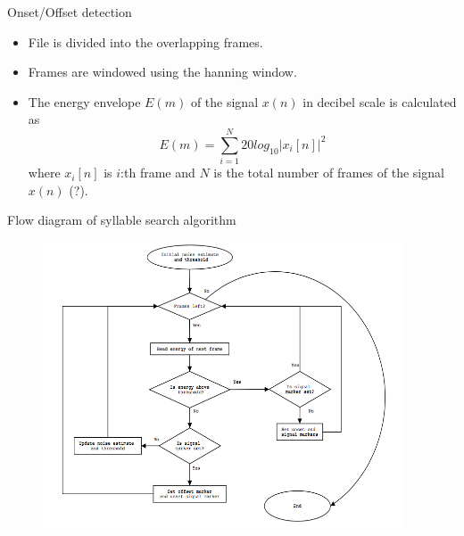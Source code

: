\documentclass[10pt]{beamer}
\begin{document}
\begin{frame}[fragile]{Onset/Offset detection}
\begin{itemize}
\item File is divided into the overlapping frames.
\item Frames are windowed using the hanning window.
\item The energy envelope $E(m)$ of the signal $x(n)$ in decibel scale is calculated as
\begin{equation}
E(m) = \sum\limits_{i=1}^{N} 20log_{10}|x_i[n]|^2
\end{equation}
where $x_i[n]$ is $i$:th frame and $N$ is the total number of frames of the signal $x(n)$ (?).
\end{itemize}
\end{frame}

\begin{frame}[fragile]{Flow diagram of syllable search algorithm}
\begin{figure}
\includegraphics[width=0.95\textwidth]{flow}
\end{figure}
\end{frame}
\end{document}

